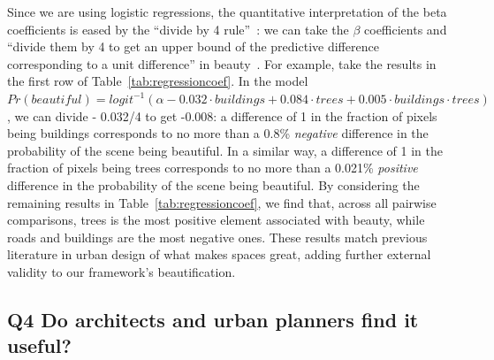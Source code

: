 Since we are using logistic regressions, the quantitative interpretation of the beta coefficients is eased by the ``divide by 4 rule''~\cite{vaughn2008data}: we can take the $\beta$ coefficients and ``divide them by 4 to get an upper bound of the predictive difference corresponding to a unit difference'' in beauty~\cite{vaughn2008data}. For example, take the results in the first row of Table~\ref{tab:regressioncoef}. In the model $Pr(beautiful) = logit^{-1}(\alpha - 0.032 \cdot buildings + 0.084 \cdot trees + 0.005 \cdot  buildings \cdot trees)$, we can divide - 0.032/4 to get -0.008: a difference of 1 in the fraction of pixels being buildings corresponds to no more than a 0.8\% \emph{negative} difference in the probability of the scene being beautiful. In a similar way, a difference of 1 in the fraction of pixels being trees corresponds to no more than a 0.021\% \emph{positive} difference in the probability of the scene being beautiful. By considering the remaining results in Table~\ref{tab:regressioncoef}, we find that, across all pairwise comparisons, trees is the most positive element associated with beauty, while roads and buildings are the most negative ones. These results match previous literature in urban design of what makes spaces great, adding further external validity to our framework's beautification. 




\subsection*{Q4 Do architects and urban planners find it useful?}

\begin{table}[t!]
    \centering
    \caption{Urban experts polled about the extent to which an interactive map of ``FaceLifted'' scenes promotes: (a) decision making; (b) citizen participation in urban planning; and (c) promotion of green cities}
    \label{tab:useCases}
    \vspace{-10mm}
\end{table}



